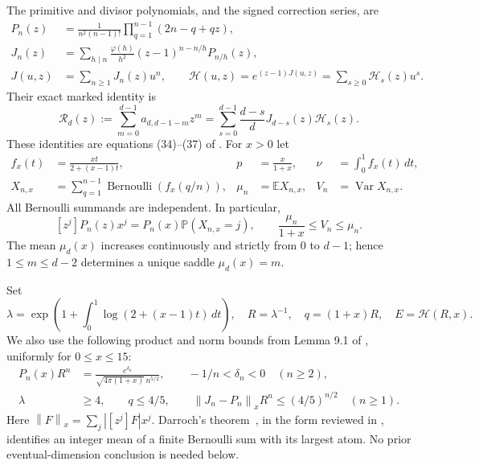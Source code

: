 \documentclass[11pt]{article}
\theoremstyle{remark}\newtheorem{remark}[theorem]{Remark}
\newcommand{\Prb}{\mathbb P}
\newcommand{\E}{\mathbb E}
\newcommand{\Var}{\operatorname{Var}}
\newcommand{\Rpoly}{\mathcal R}
\newcommand{\Hcal}{\mathcal H}
\newcommand{\norm}[1]{\left\|#1\right\|_x}
\newcommand{\dd}{\,dt}
\begin{document}
The primitive and divisor polynomials, and the signed correction series, are
\begin{align}
 P_n(z)&=\frac{1}{n^2(n-1)!}\prod_{q=1}^{n-1}(2n-q+qz),\label{eq:primitive}\\
 J_n(z)&=\sum_{h\mid n}\frac{\varphi(h)}{h^2}(z-1)^{n-n/h}P_{n/h}(z),\\
 J(u,z)&=\sum_{n\ge1}J_n(z)u^n,\qquad
 \Hcal(u,z)=e^{(z-1)J(u,z)}=\sum_{s\ge0}\Hcal_s(z)u^s.
\end{align}
Their exact marked identity is
\begin{equation}\label{eq:marked}
 \Rpoly_d(z):=\sum_{m=0}^{d-1}a_{d,d-1-m}z^m
 =\sum_{s=0}^{d-1}\frac{d-s}{d}J_{d-s}(z)\Hcal_s(z).
\end{equation}
These identities are equations (34)--(37) of \cite{decastro}.
For $x>0$ let
\begin{align}
 f_x(t)&=\frac{xt}{2+(x-1)t},&
 p&=\frac{x}{1+x},&
 \nu&=\int_0^1f_x(t)\dd,\\
 X_{n,x}&=\sum_{q=1}^{n-1}\operatorname{Bernoulli}(f_x(q/n)),&
 \mu_n&=\E X_{n,x},&
 V_n&=\Var X_{n,x}.
\end{align}
All Bernoulli summands are independent. In particular,
\begin{equation}\label{eq:PB}
 [z^j]P_n(z)x^j=P_n(x)\Prb(X_{n,x}=j),\qquad
 \frac{\mu_n}{1+x}\le V_n\le\mu_n.
\end{equation}
The mean $\mu_d(x)$ increases continuously and strictly from $0$ to $d-1$;
hence $1\le m\le d-2$ determines a unique saddle $\mu_d(x)=m$.

Set
\begin{equation}
 \lambda=\exp\left(1+\int_0^1\log(2+(x-1)t)\dd\right),\quad
 R=\lambda^{-1},\quad q=(1+x)R,\quad E=\Hcal(R,x).
\end{equation}
We also use the following product and norm bounds from Lemma 9.1 of
\cite{decastro}, uniformly for $0\le x\le15$:
\begin{align}
 P_n(x)R^n
 &=\frac{e^{\delta_n}}{\sqrt{4\pi(1+x)}\,n^{5/2}},
 \qquad -1/n<\delta_n<0\quad(n\ge2),\label{eq:product}\\
 \lambda&\ge4,\qquad q\le4/5,\qquad
 \norm{J_n-P_n}R^n\le(4/5)^{n/2}\quad(n\ge1).\label{eq:periodic}
\end{align}
Here $\norm F=\sum_j|[z^j]F|x^j$.
Darroch's theorem~\cite{darroch}, in the form reviewed in
\cite[p.~284]{pitman}, identifies an integer mean of a finite Bernoulli sum
with its largest atom. No prior eventual-dimension conclusion is needed below.
\end{document}
